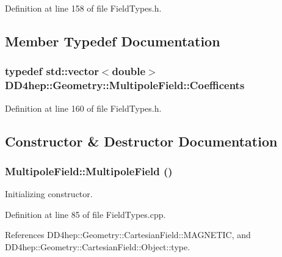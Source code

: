 Definition at line 158 of file FieldTypes.h.

\subsection{Member Typedef Documentation}
\hypertarget{class_d_d4hep_1_1_geometry_1_1_multipole_field_a760b1b7561c93dd8438ea523cbc660bc}{
\subsubsection[{Coefficents}]{\setlength{\rightskip}{0pt plus 5cm}typedef std::vector$<$double$>$ {\bf DD4hep::Geometry::MultipoleField::Coefficents}}}
\label{class_d_d4hep_1_1_geometry_1_1_multipole_field_a760b1b7561c93dd8438ea523cbc660bc}


Definition at line 160 of file FieldTypes.h.

\subsection{Constructor \& Destructor Documentation}
\hypertarget{class_d_d4hep_1_1_geometry_1_1_multipole_field_a66745189fa088d26122bbf841eb18f90}{
\subsubsection[{MultipoleField}]{\setlength{\rightskip}{0pt plus 5cm}MultipoleField::MultipoleField ()}}
\label{class_d_d4hep_1_1_geometry_1_1_multipole_field_a66745189fa088d26122bbf841eb18f90}


Initializing constructor. 

Definition at line 85 of file FieldTypes.cpp.

References DD4hep::Geometry::CartesianField::MAGNETIC, and DD4hep::Geometry::CartesianField::Object::type.

